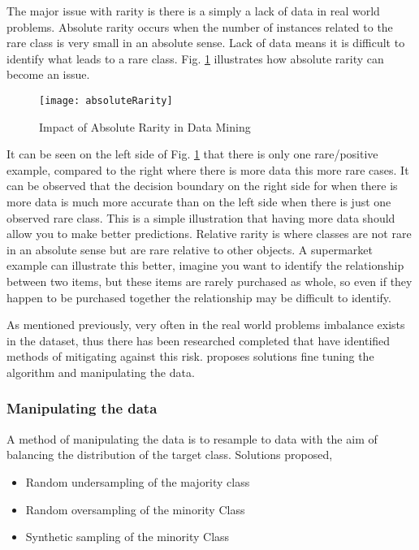 The major issue with rarity is there is a simply a lack of data in real world problems. Absolute rarity occurs when the number of instances related to the rare class is very small in an absolute sense. Lack of data means it is difficult to identify what leads to a rare class. Fig. \ref{fig:absoluteRarity} illustrates how absolute rarity can become an issue.

\begin{figure}[H]
	\texttt{[image: absoluteRarity]}
	\caption{
		Impact of Absolute Rarity in Data Mining \\ \cite[Source:][]{weiss_mining_2004}
	}
	\label{fig:absoluteRarity}
\end{figure}

It can be seen on the left side of Fig. \ref{fig:absoluteRarity} that there is only one rare/positive example, compared to the right where there is more data this more rare cases. It can be observed that the decision boundary on the right side for when there is more data is much more accurate than on the left side when there is just one observed rare class. This is a simple illustration that having more data should allow you to make better predictions. Relative rarity is where classes are not rare in an absolute sense but are rare relative to other objects. A supermarket example can illustrate this better, imagine you want to identify the relationship between two items, but these items are rarely purchased as whole, so even if they happen to be purchased together the relationship may be difficult to identify.

As mentioned previously, very often in the real world problems imbalance exists in the dataset, thus there has been researched completed that have identified methods of mitigating against this risk. \citep{chawla_editorial:_2004} proposes solutions fine tuning the algorithm and manipulating the data. 

\subsubsection{Manipulating the data} \label{sec:dataManip}

A method of manipulating the data is to resample to data with the aim of balancing the distribution of the target class. Solutions proposed,

\begin{itemize}
	\item Random undersampling of the majority class
	\item Random oversampling of the minority Class
	\item Synthetic sampling of the minority Class 
\end{itemize}


